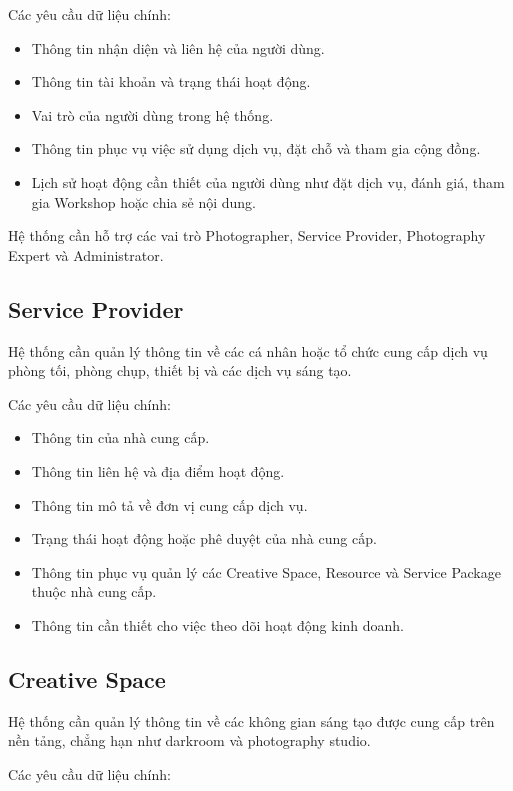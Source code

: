 Các yêu cầu dữ liệu chính:

\begin{itemize}
\item Thông tin nhận diện và liên hệ của người dùng.
\item Thông tin tài khoản và trạng thái hoạt động.
\item Vai trò của người dùng trong hệ thống.
\item Thông tin phục vụ việc sử dụng dịch vụ, đặt chỗ và tham gia cộng đồng.
\item Lịch sử hoạt động cần thiết của người dùng như đặt dịch vụ, đánh giá, tham gia Workshop hoặc chia sẻ nội dung.
\end{itemize}

Hệ thống cần hỗ trợ các vai trò Photographer, Service Provider, Photography Expert và Administrator.

\subsection{Service Provider}

Hệ thống cần quản lý thông tin về các cá nhân hoặc tổ chức cung cấp dịch vụ phòng tối, phòng chụp, thiết bị và các dịch vụ sáng tạo.

Các yêu cầu dữ liệu chính:

\begin{itemize}
\item Thông tin của nhà cung cấp.
\item Thông tin liên hệ và địa điểm hoạt động.
\item Thông tin mô tả về đơn vị cung cấp dịch vụ.
\item Trạng thái hoạt động hoặc phê duyệt của nhà cung cấp.
\item Thông tin phục vụ quản lý các Creative Space, Resource và Service Package thuộc nhà cung cấp.
\item Thông tin cần thiết cho việc theo dõi hoạt động kinh doanh.
\end{itemize}

\subsection{Creative Space}

Hệ thống cần quản lý thông tin về các không gian sáng tạo được cung cấp trên nền tảng, chẳng hạn như darkroom và photography studio.

Các yêu cầu dữ liệu chính:

